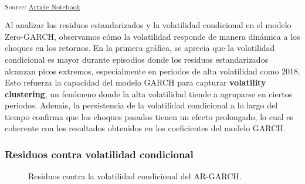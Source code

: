 \documentclass[
  number,
  preprint,
  3p,
  onecolumn]{elsarticle}
\begin{document}
\textsubscript{Source:
\href{https://iancont.github.io/fixed_income_garch/index-preview.html}{Article
Notebook}}

Al analizar los residuos estandarizados y la volatilidad condicional en
el modelo Zero-GARCH, observamos cómo la volatilidad responde de manera
dinámica a los choques en los retornos. En la primera gráfica, se
aprecia que la volatilidad condicional es mayor durante episodios donde
los residuos estandarizados alcanzan picos extremos, especialmente en
periodos de alta volatilidad como 2018. Esto refuerza la capacidad del
modelo GARCH para capturar \textbf{volatility clustering}, un fenómeno
donde la alta volatilidad tiende a agruparse en ciertos periodos.
Además, la persistencia de la volatilidad condicional a lo largo del
tiempo confirma que los choques pasados tienen un efecto prolongado, lo
cual es coherente con los resultados obtenidos en los coeficientes del
modelo GARCH.

\subsubsection{Residuos contra volatilidad
condicional}\label{residuos-contra-volatilidad-condicional}

\begin{figure}[H]


\caption{\label{fig-residuals-vs-volatility}Residuos contra la
volatilidad condicional del AR-GARCH.}

\end{figure}%
\end{document}
